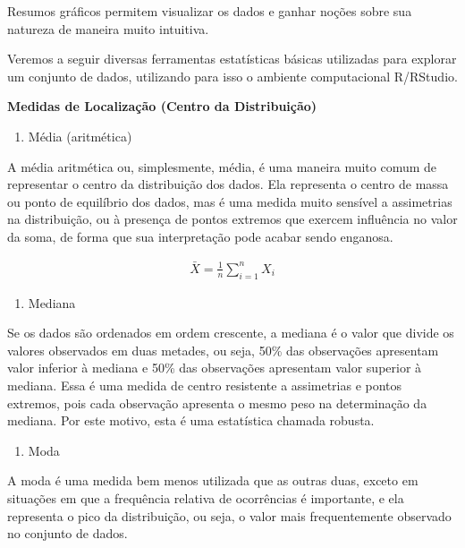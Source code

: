 \documentclass[
]{book}
\providecommand{\tightlist}{%
  \setlength{\itemsep}{0pt}\setlength{\parskip}{0pt}}
\theoremstyle{definition}
\theoremstyle{definition}
\theoremstyle{definition}
\theoremstyle{remark}
\begin{document}
Resumos gráficos permitem visualizar os dados e ganhar noções sobre sua natureza de maneira muito intuitiva.

Veremos a seguir diversas ferramentas estatísticas básicas utilizadas para explorar um conjunto de dados, utilizando para isso o ambiente computacional R/RStudio.

\textbf{Medidas de Localização (Centro da Distribuição)}

\begin{enumerate}
\def\labelenumi{\alph{enumi}.}
\tightlist
\item
  Média (aritmética)
\end{enumerate}

A média aritmética ou, simplesmente, média, é uma maneira muito comum de representar o centro da distribuição dos dados. Ela representa o centro de massa ou ponto de equilíbrio dos dados, mas é uma medida muito sensível a assimetrias na distribuição, ou à presença de pontos extremos que exercem influência no valor da soma, de forma que sua interpretação pode acabar sendo enganosa.

\begin{align*}
  \bar{X} = \frac{1}{n}\sum_{i=1}^{n}X_i
\end{align*}

\begin{enumerate}
\def\labelenumi{\alph{enumi}.}
\setcounter{enumi}{1}
\tightlist
\item
  Mediana
\end{enumerate}

Se os dados são ordenados em ordem crescente, a mediana é o valor que divide os valores observados em duas metades, ou seja, 50\% das observações apresentam valor inferior à mediana e 50\% das observações apresentam valor superior à mediana. Essa é uma medida de centro resistente a assimetrias e pontos extremos, pois cada observação apresenta o mesmo peso na determinação da mediana. Por este motivo, esta é uma estatística chamada robusta.

\begin{enumerate}
\def\labelenumi{\alph{enumi}.}
\setcounter{enumi}{2}
\tightlist
\item
  Moda
\end{enumerate}

A moda é uma medida bem menos utilizada que as outras duas, exceto em situações em que a frequência relativa de ocorrências é importante, e ela representa o pico da distribuição, ou seja, o valor mais frequentemente observado no conjunto de dados.
\end{document}
